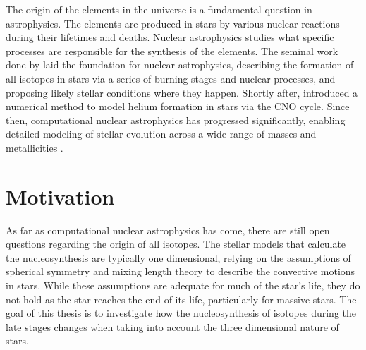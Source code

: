 The origin of the elements in the universe is a fundamental question in astrophysics. 
The elements are produced in stars by various nuclear reactions during their lifetimes and deaths. 
Nuclear astrophysics studies what specific processes are responsible for the synthesis of the elements. 
The seminal work done by \cite{burbidgeSynthesisElementsStars1957} laid the foundation for nuclear astrophysics, describing the formation of all isotopes in stars via a series of burning stages and nuclear processes, and proposing likely stellar conditions where they happen.
Shortly after, \cite{henyeyNewMethodAutomatic1964} introduced a numerical method to model helium formation in stars via the CNO cycle. 
Since then, computational nuclear astrophysics has progressed significantly, enabling detailed modeling of stellar evolution across a wide range of masses and metallicities \citep{pignatariNuGridStellarData2016, ritterNuGridStellarData2018, battinoNuGridStellarData2019}.

\section{Motivation}

As far as computational nuclear astrophysics has come, there are still open questions regarding the origin of all isotopes.
The stellar models that calculate the nucleosynthesis are typically one dimensional, relying on the assumptions of spherical symmetry and mixing length theory to describe the convective motions in stars.
While these assumptions are adequate for much of the star's life, they do not hold as the star reaches the end of its life, particularly for massive stars.
The goal of this thesis is to investigate how the nucleosynthesis of isotopes during the late stages changes when taking into account the three dimensional nature of stars.


